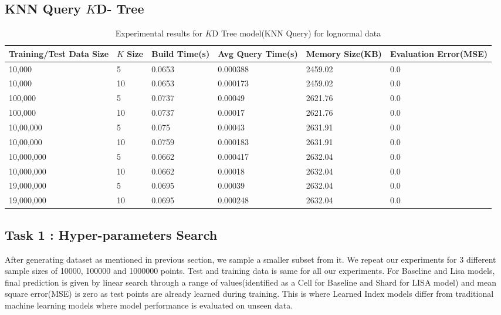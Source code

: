 \subsection{KNN Query $K$D- Tree}
\begin{table}
	\centering
	\begin{tabular}{||p{}<{\centering}|p{}<{\centering}| p{}<{\centering}|p{}<{\centering}|p{}<{\centering}|p{}<{\centering}||}
		\hline
		Training/Test Data Size& $K$ Size & Build Time(s) & Avg Query Time(s) & Memory Size(KB) & Evaluation Error(MSE)\\ [0.5ex] 
		\hline
		\hline
		10,000& 5 & 0.0653 & 0.000388 & 2459.02 & 0.0\\
		\hline
		10,000& 10 & 0.0653 & 0.000173 & 2459.02 & 0.0\\
		\hline
		100,000& 5 & 0.0737 & 0.00049 & 2621.76 & 0.0\\
		\hline
		100,000&  10 & 0.0737 & 0.00017 & 2621.76 & 0.0\\
		\hline
		10,00,000&  5 & 0.075 & 0.00043 & 2631.91 & 0.0\\
		\hline
		10,00,000&  10 & 0.0759 & 0.000183 & 2631.91 & 0.0\\
		\hline 
		10,000,000&  5 & 0.0662 & 0.000417 & 2632.04 & 0.0\\
		\hline
		10,000,000&  10 & 0.0662 & 0.00018 & 2632.04 & 0.0\\
		\hline
		19,000,000&  5 & 0.0695 & 0.00039 & 2632.04 & 0.0\\
		\hline
		19,000,000& 10 & 0.0695 & 0.000248 & 2632.04 & 0.0\\
        \hline
		\hline
	\end{tabular}
    \label{lognormal_KD_Tree_KNN_Query}
	\caption{Experimental results for $K$D Tree model(KNN Query) for lognormal data}
\end{table}

\subsection{Task 1 : Hyper-parameters Search }
After generating dataset as mentioned in previous section, we sample a smaller subset from it. We repeat our experiments for 3 different sample sizes of 10000, 100000 and 1000000 points. Test and training data is same for all our experiments. For Baseline and Lisa models, final prediction is given by linear search through a range of values(identified as a Cell for Baseline and Shard for LISA model) and mean square error(MSE) is zero as test points are already learned during training. This is where Learned Index models differ from traditional machine learning models where model performance is evaluated on unseen data. 

